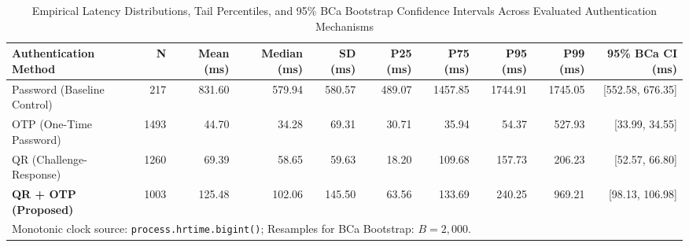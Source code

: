 \begin{table}[t]
\centering
\small
\caption{Empirical Latency Distributions, Tail Percentiles, and 95\% BCa Bootstrap Confidence Intervals Across Evaluated Authentication Mechanisms}
\label{tab:latency_distributions}
\begin{tabular}{lrrrrrrrrr}
\hline
\textbf{Authentication Method} & \textbf{N} & \textbf{Mean (ms)} & \textbf{Median (ms)} & \textbf{SD (ms)} & \textbf{P25 (ms)} & \textbf{P75 (ms)} & \textbf{P95 (ms)} & \textbf{P99 (ms)} & \textbf{95\% BCa CI (ms)} \\
\hline
Password (Baseline Control) & 217 & 831.60 & 579.94 & 580.57 & 489.07 & 1457.85 & 1744.91 & 1745.05 & [552.58, 676.35] \\
OTP (One-Time Password) & 1493 & 44.70 & 34.28 & 69.31 & 30.71 & 35.94 & 54.37 & 527.93 & [33.99, 34.55] \\
QR (Challenge-Response) & 1260 & 69.39 & 58.65 & 59.63 & 18.20 & 109.68 & 157.73 & 206.23 & [52.57, 66.80] \\
\textbf{QR + OTP (Proposed)} & 1003 & 125.48 & 102.06 & 145.50 & 63.56 & 133.69 & 240.25 & 969.21 & [98.13, 106.98] \\
\hline
\multicolumn{10}{l}{\footnotesize Monotonic clock source: \texttt{process.hrtime.bigint()}; Resamples for BCa Bootstrap: $B = 2,000$.} \\
\end{tabular}
\end{table}
